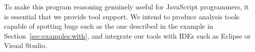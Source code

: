 \documentclass{article}
\begin{document}
%

To make this program reasoning genuinely useful for JavaScript
programmers, it is essential that we provide tool support. We intend
to produce analysis tools capable of spotting bugs such as the one
described in the  example in Section~\ref{sec:examples:with},
and integrate our tools with IDEs such as Eclipse or Visual Studio.







\end{document}
